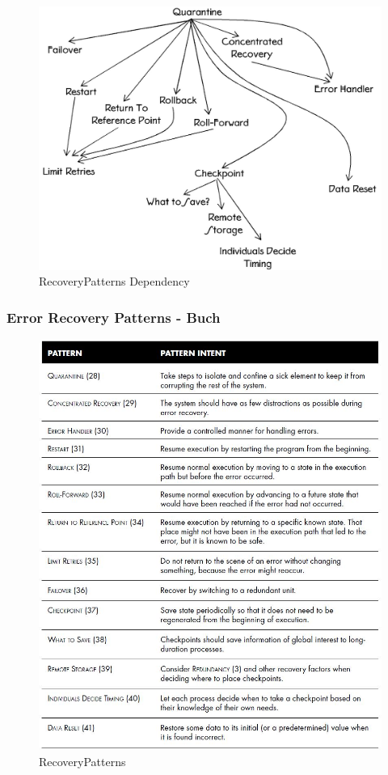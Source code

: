 \begin{figure}[H]
	\centering
	\includegraphics[width=\textwidth]{content/faulttolerance/images/RecoveryPatterns_Dependency.JPG}
	\caption{RecoveryPatterns Dependency}
\end{figure}


\subsubsection*{Error Recovery Patterns - Buch}

\begin{figure}[H]
	\centering
	\includegraphics[width=\textwidth]{content/faulttolerance/images/RecoveryPatterns.JPG}
	\caption{RecoveryPatterns}
\end{figure}


